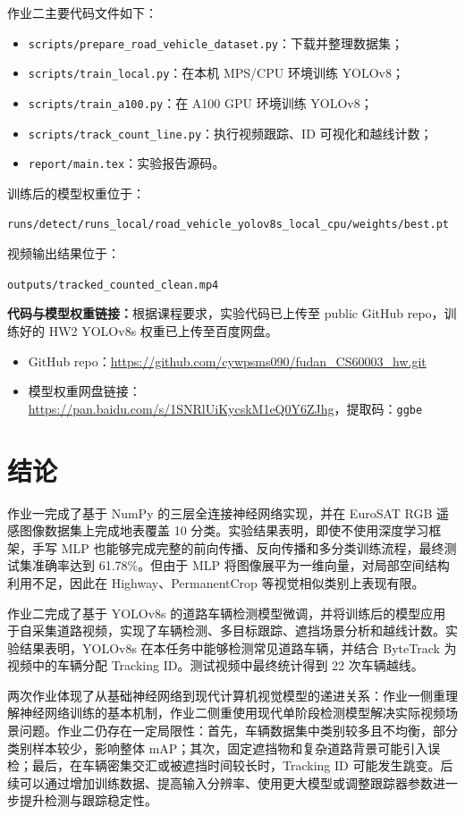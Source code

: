 \documentclass[UTF8,a4paper,12pt]{ctexart}
\begin{document}
作业二主要代码文件如下：

\begin{itemize}
    \item \texttt{scripts/prepare\_road\_vehicle\_dataset.py}：下载并整理数据集；
    \item \texttt{scripts/train\_local.py}：在本机 MPS/CPU 环境训练 YOLOv8；
    \item \texttt{scripts/train\_a100.py}：在 A100 GPU 环境训练 YOLOv8；
    \item \texttt{scripts/track\_count\_line.py}：执行视频跟踪、ID 可视化和越线计数；
    \item \texttt{report/main.tex}：实验报告源码。
\end{itemize}

训练后的模型权重位于：

\begin{center}
\texttt{runs/detect/runs\_local/road\_vehicle\_yolov8s\_local\_cpu/weights/best.pt}
\end{center}

视频输出结果位于：

\begin{center}
\texttt{outputs/tracked\_counted\_clean.mp4}
\end{center}

\textbf{代码与模型权重链接：}根据课程要求，实验代码已上传至 public GitHub repo，训练好的 HW2 YOLOv8s 权重已上传至百度网盘。

\begin{itemize}
    \item GitHub repo：\url{https://github.com/cywpsms090/fudan_CS60003_hw.git}
    \item 模型权重网盘链接：\url{https://pan.baidu.com/s/1SNRlUiKycskM1eQ0Y6ZJhg}，提取码：\texttt{ggbe}
\end{itemize}

\section{结论}

作业一完成了基于 NumPy 的三层全连接神经网络实现，并在 EuroSAT RGB 遥感图像数据集上完成地表覆盖 10 分类。实验结果表明，即使不使用深度学习框架，手写 MLP 也能够完成完整的前向传播、反向传播和多分类训练流程，最终测试集准确率达到 61.78\%。但由于 MLP 将图像展平为一维向量，对局部空间结构利用不足，因此在 Highway、PermanentCrop 等视觉相似类别上表现有限。

作业二完成了基于 YOLOv8s 的道路车辆检测模型微调，并将训练后的模型应用于自采集道路视频，实现了车辆检测、多目标跟踪、遮挡场景分析和越线计数。实验结果表明，YOLOv8s 在本任务中能够检测常见道路车辆，并结合 ByteTrack 为视频中的车辆分配 Tracking ID。测试视频中最终统计得到 22 次车辆越线。

两次作业体现了从基础神经网络到现代计算机视觉模型的递进关系：作业一侧重理解神经网络训练的基本机制，作业二侧重使用现代单阶段检测模型解决实际视频场景问题。作业二仍存在一定局限性：首先，车辆数据集中类别较多且不均衡，部分类别样本较少，影响整体 mAP；其次，固定遮挡物和复杂道路背景可能引入误检；最后，在车辆密集交汇或被遮挡时间较长时，Tracking ID 可能发生跳变。后续可以通过增加训练数据、提高输入分辨率、使用更大模型或调整跟踪器参数进一步提升检测与跟踪稳定性。
\end{document}

